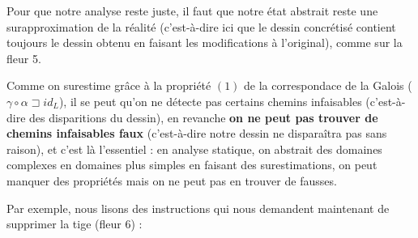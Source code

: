 \documentclass[french]{article}
\begin{document}
  Pour que notre analyse reste juste, il faut que notre état abstrait reste une surapproximation de la réalité (c'est-à-dire ici que le dessin concrétisé contient toujours le dessin obtenu en faisant les modifications à l'original), comme sur la fleur 5.

  Comme on surestime grâce à la propriété $(1)$ de la correspondace de la Galois ($\gamma \circ \alpha \sqsupset id_L$), il se peut qu'on ne détecte pas certains chemins infaisables (c'est-à-dire des disparitions du dessin), en revanche \textbf{on ne peut pas trouver de chemins infaisables faux} (c'est-à-dire notre dessin ne disparaîtra pas sans raison), et c'est là l'essentiel : en analyse statique, on abstrait des domaines complexes en domaines plus simples en faisant des surestimations, on peut manquer des propriétés mais on ne peut pas en trouver de fausses.

  Par exemple, nous lisons des instructions qui nous demandent maintenant de supprimer la tige (fleur 6) :
\end{document}

